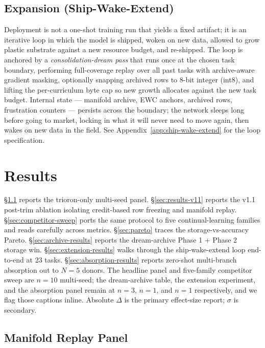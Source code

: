 \documentclass[11pt]{article}
\begin{document}
\subsection{Expansion (Ship-Wake-Extend)}
\label{sec:methods-expand}

Deployment is not a one-shot training run that yields a fixed
artifact; it is an iterative loop in which the model is shipped,
woken on new data, allowed to grow plastic substrate against a new
resource budget, and re-shipped. The loop is anchored by a
\emph{consolidation-dream pass} that runs once at the chosen task
boundary, performing full-coverage replay over all past tasks with
archive-aware gradient masking, optionally snapping archived rows to
8-bit integer (int8), and lifting the per-curriculum byte cap so new
growth allocates against the new task budget. Internal state ---
manifold archive, EWC anchors, archived rows, frustration counters
--- persists across the boundary; the network sleeps long before
going to market, locking in what it will never need to move again,
then wakes on new data in the field. See
Appendix~\ref{app:ship-wake-extend} for the loop specification.



\section{Results}
\label{sec:results}

\S\ref{sec:headline} reports the trioron-only multi-seed panel.
\S\ref{sec:results-v11} reports the v1.1 post-trim ablation
isolating credit-based row freezing and manifold replay.
\S\ref{sec:competitor-sweep} ports the same protocol to five
continual-learning families and reads carefully across metrics.
\S\ref{sec:pareto} traces the storage-vs-accuracy Pareto.
\S\ref{sec:archive-results} reports the dream-archive Phase 1 + Phase
2 storage win. \S\ref{sec:extension-results} walks through the
ship-wake-extend loop end-to-end at 23 tasks.
\S\ref{sec:absorption-results} reports zero-shot multi-branch
absorption out to $N = 5$ donors. The headline panel and
five-family competitor sweep are $n = 10$ multi-seed; the
dream-archive table, the extension experiment, and the absorption
panel remain at $n = 3$, $n = 1$, and $n = 1$ respectively, and we
flag those captions inline. Absolute $\Delta$ is the primary
effect-size report; $\sigma$ is secondary.

\subsection{Manifold Replay Panel}
\label{sec:headline}
\end{document}
